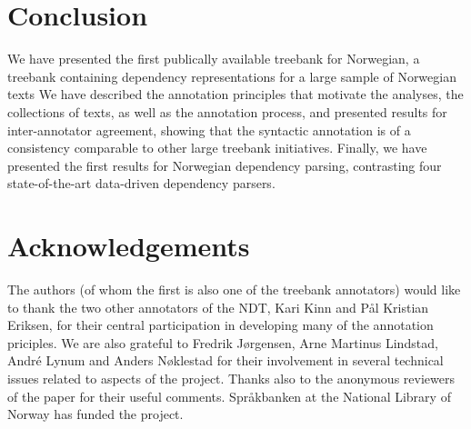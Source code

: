 \documentclass[10pt,a4paper]{article}
\begin{document}
\section{Conclusion}
We have presented the first publically available treebank for Norwegian, a treebank
containing dependency representations for a large sample of Norwegian
texts
We have described the
annotation principles that motivate the analyses, the collections of
texts, as well as the annotation process, and presented results for
inter-annotator agreement, showing that the syntactic annotation is of
a consistency comparable to other large treebank initiatives. Finally,
we have presented the first results for Norwegian dependency parsing,
contrasting four state-of-the-art data-driven dependency parsers.

\section{Acknowledgements}

The authors (of whom the first is also one of the treebank annotators) would like to thank the two other annotators of the NDT, Kari Kinn and Pål Kristian Eriksen, for their central participation in developing many of the annotation priciples. We are also grateful to Fredrik Jørgensen, Arne Martinus Lindstad, André Lynum and Anders Nøklestad for their involvement in several technical issues related to aspects of the project. Thanks also to the anonymous reviewers of the paper for their useful comments. Spr{\aa}kbanken at the National Library of Norway has funded the project.





\end{document}
